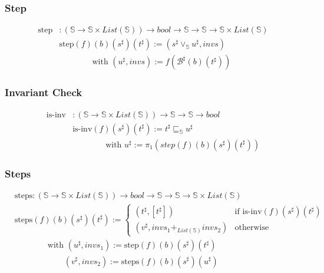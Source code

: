 \documentclass{beamer}
\begin{document}
\begin{frame}
    \frametitle{Step}
    \begin{align*}
        \text{step} &: (\mathbb{S} \to \mathbb{S} \times List(\mathbb{S})) \to bool \to \mathbb{S} \to \mathbb{S} \to \mathbb{S} \times List(\mathbb{S}) \\
        &\text{step} (f) (b) (s^{\sharp}) (t^{\sharp}) := (s^{\sharp} \vee_\mathbb{S} u^{\sharp}, invs)\\
        & \qquad \qquad \text{with } (u^{\sharp}, invs) := f (\mathcal{B}^{\sharp} (b) (t^{\sharp}))
    \end{align*}
\end{frame}

\begin{frame}
    \frametitle{Invariant Check}
    \begin{align*}
        \text{is-inv} &: (\mathbb{S} \to \mathbb{S} \times List(\mathbb{S}))  \to \mathbb{S} \to \mathbb{S} \to bool \\
        & \text{is-inv} (f) (s^{\sharp}) (t^{\sharp}) := t^{\sharp} \sqsubseteq_\mathbb{S} u^{\sharp} \\
        & \qquad \qquad \text{with } u^{\sharp} := \pi_1 (step (f) (b) (s^{\sharp}) (t^{\sharp}))
    \end{align*}
\end{frame}





        \begin{frame}
            \frametitle{Steps}
            \begin{align*}
                &\text{steps} : (\mathbb{S} \to \mathbb{S} \times List(\mathbb{S})) \to bool \to \mathbb{S} \to \mathbb{S} \to \mathbb{S} \times List(\mathbb{S}) \\
                &\text{steps} (f) (b) (s^{\sharp}) (t^{\sharp}) := \begin{cases}
                                                                (t^{\sharp}, [t^{\sharp}]) & \text{if } \text{is-inv} (f) (s^{\sharp}) (t^{\sharp}) \\
                                                                (v^{\sharp}, invs_1 +_{List(\mathbb{S})} invs_2) & \text{otherwise}
                                                            \end{cases} \\
            & \qquad \qquad \text{with } (u^{\sharp}, invs_1) := \text{step} (f) (b) (s^{\sharp}) (t^{\sharp}) \\
            & \qquad \qquad \qquad (v^{\sharp}, invs_2) := \text{steps} (f) (b) (s^{\sharp}) (u^{\sharp})
            \end{align*}
        \end{frame}
\end{document}
